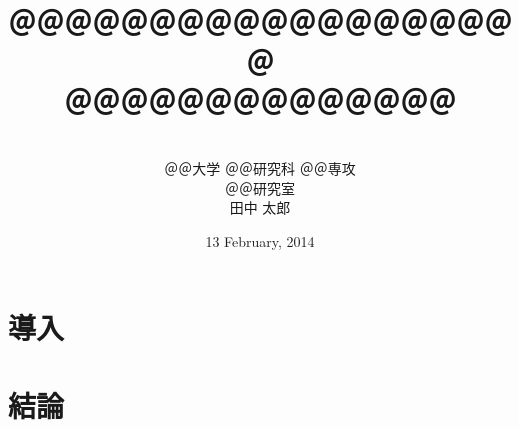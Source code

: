 \documentclass[uplatex,a4paper,12pt]{ujreport}
\title{
	\vspace{1cm}{\Large ＠＠＠＠＠論文}
	\\
	\vspace{2.5zw}
	{\LARGE
		＠＠＠＠＠＠＠＠＠＠＠＠＠＠＠＠＠＠＠
		\\
		＠＠＠＠＠＠＠＠＠＠＠＠＠＠
	}
}
\author{
	\vspace{5cm}
	\\
	＠＠大学 ＠＠研究科 ＠＠専攻
	\\
	＠＠研究室
	\\
	田中 太郎
}
\date{13 February, 2014}
\begin{document}
\maketitle

\chapter{導入}

\chapter{結論}

\end{document}
